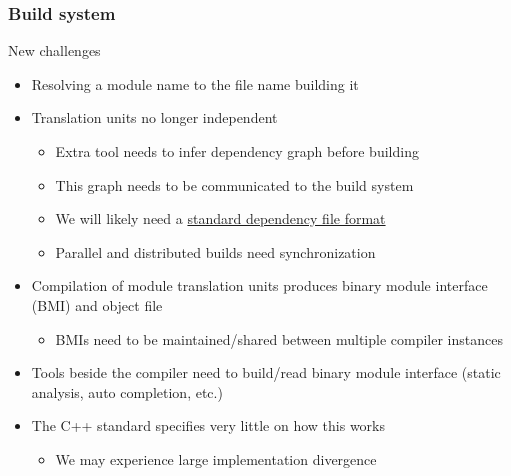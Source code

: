 \begin{frame}[fragile]
    \frametitle{Build system}
    \begin{block}{New challenges}
      \begin{itemize}
        \item Resolving a module name to the file name building it
        \item Translation units no longer independent
        \begin{itemize}
          \item Extra tool needs to infer dependency graph before building
          \item This graph needs to be communicated to the build system
          \item We will likely need a \href{https://wg21.link/P1689}{standard dependency file format}
          \item Parallel and distributed builds need synchronization
        \end{itemize}
        \item Compilation of module translation units produces binary module interface (BMI) and object file
        \begin{itemize}
          \item BMIs need to be maintained/shared between multiple compiler instances
        \end{itemize}
        \item Tools beside the compiler need to build/read binary module interface (static analysis, auto completion, etc.)
        \item The C++ standard specifies very little on how this works
        \begin{itemize}
          \item We may experience large implementation divergence
        \end{itemize}
      \end{itemize}
    \end{block}
\end{frame}

